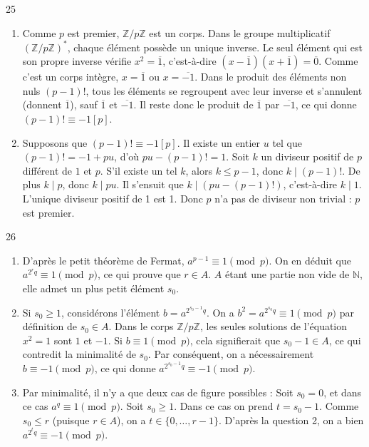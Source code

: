 \begin{correction}{25}
\begin{enumerate}
 \item[a)] Comme $p$ est premier, $\mathbb{Z}/p\mathbb{Z}$ est un corps. 
 Dans le groupe multiplicatif $(\mathbb{Z}/p\mathbb{Z})^*$, chaque élément possède un unique inverse. 
 Le seul élément qui est son propre inverse vérifie $x^2 = \overline{1}$, c'est-à-dire $(x-\overline{1})(x+\overline{1}) = \overline{0}$. Comme c'est un corps intègre, $x = \overline{1}$ ou $x = \overline{-1}$. 
 Dans le produit des éléments non nuls $(p-1)!$, tous les éléments se regroupent avec leur inverse et s'annulent (donnent $\overline{1}$), sauf $\overline{1}$ et $\overline{-1}$. 
 Il reste donc le produit de $\overline{1}$ par $\overline{-1}$, ce qui donne $(p-1)! \equiv -1 [p]$. 
 
 \item[b)] Supposons que $(p-1)! \equiv -1 [p]$. Il existe un entier $u$ tel que $(p-1)! = -1 + pu$, d'où $pu - (p-1)! = 1$. 
 Soit $k$ un diviseur positif de $p$ différent de $1$ et $p$. S'il existe un tel $k$, alors $k \le p-1$, donc $k \mid (p-1)!$. 
 De plus $k \mid p$, donc $k \mid pu$. Il s'ensuit que $k \mid (pu - (p-1)!)$, c'est-à-dire $k \mid 1$. 
 L'unique diviseur positif de 1 est 1. Donc $p$ n'a pas de diviseur non trivial : $p$ est premier. 
\end{enumerate}
\end{correction}

\begin{correction}{26}
\begin{enumerate}
 \item D'après le petit théorème de Fermat, $a^{p-1} \equiv 1 \pmod{p}$. 
 On en déduit que $a^{2^r q} \equiv 1 \pmod{p}$, ce qui prouve que $r \in A$. 
 $A$ étant une partie non vide de $\mathbb{N}$, elle admet un plus petit élément $s_0$. 
 
 \item Si $s_0 \ge 1$, considérons l'élément $b = a^{2^{s_0-1} q}$. 
 On a $b^2 = a^{2^{s_0} q} \equiv 1 \pmod{p}$ par définition de $s_0 \in A$. 
 Dans le corps $\mathbb{Z}/p\mathbb{Z}$, les seules solutions de l'équation $x^2 = 1$ sont $1$ et $-1$. 
 Si $b \equiv 1 \pmod{p}$, cela signifierait que $s_0-1 \in A$, ce qui contredit la minimalité de $s_0$. 
 Par conséquent, on a nécessairement $b \equiv -1 \pmod{p}$, ce qui donne $a^{2^{s_0-1} q} \equiv -1 \pmod{p}$. 
 
 \item Par minimalité, il n'y a que deux cas de figure possibles :
 Soit $s_0 = 0$, et dans ce cas $a^q \equiv 1 \pmod{p}$. 
 Soit $s_0 \ge 1$. Dans ce cas on prend $t = s_0 - 1$. Comme $s_0 \le r$ (puisque $r \in A$), on a $t \in \{0, \dots, r-1\}$. 
 D'après la question 2, on a bien $a^{2^t q} \equiv -1 \pmod{p}$. 
\end{enumerate}
\end{correction}


